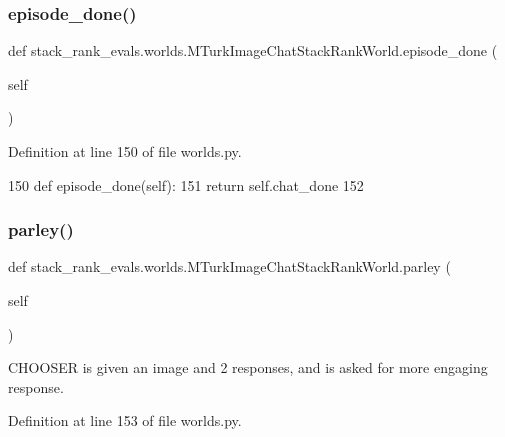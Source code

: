 \subsubsection{\texorpdfstring{episode\+\_\+done()}{episode\_done()}}
{\footnotesize\ttfamily def stack\+\_\+rank\+\_\+evals.\+worlds.\+M\+Turk\+Image\+Chat\+Stack\+Rank\+World.\+episode\+\_\+done (\begin{DoxyParamCaption}\item[{}]{self }\end{DoxyParamCaption})}



Definition at line 150 of file worlds.\+py.


\begin{DoxyCode}
150     \textcolor{keyword}{def }episode\_done(self):
151         \textcolor{keywordflow}{return} self.chat\_done
152 
\end{DoxyCode}
\mbox{\label{classstack__rank__evals_1_1worlds_1_1MTurkImageChatStackRankWorld_ace7af06e8b400b73e2d122b00293ec69}} 
\subsubsection{\texorpdfstring{parley()}{parley()}}
{\footnotesize\ttfamily def stack\+\_\+rank\+\_\+evals.\+worlds.\+M\+Turk\+Image\+Chat\+Stack\+Rank\+World.\+parley (\begin{DoxyParamCaption}\item[{}]{self }\end{DoxyParamCaption})}

\begin{DoxyVerb}CHOOSER is given an image and 2 responses, and is asked for more engaging
response.
\end{DoxyVerb}
 

Definition at line 153 of file worlds.\+py.


